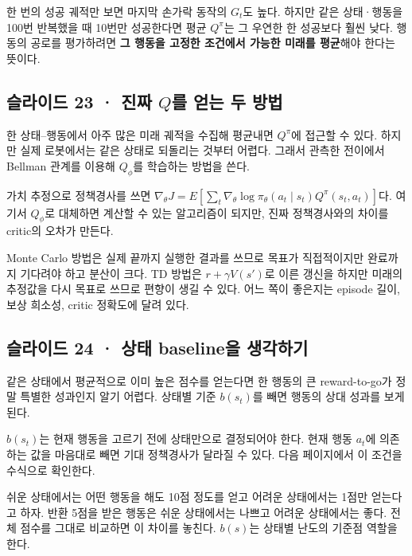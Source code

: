 \documentclass[11pt,a4paper]{article}
\begin{document}
한 번의 성공 궤적만 보면 마지막 손가락 동작의 $G_t$도 높다. 하지만 같은 상태·행동을 100번 반복했을 때 10번만 성공한다면 평균 $Q^\pi$는 그 우연한 한 성공보다 훨씬 낮다. 행동의 공로를 평가하려면 \textbf{그 행동을 고정한 조건에서 가능한 미래를 평균}해야 한다는 뜻이다.\par

\subsection{슬라이드 23 · 진짜 $Q$를 얻는 두 방법}

한 상태–행동에서 아주 많은 미래 궤적을 수집해 평균내면 $Q^\pi$에 접근할 수 있다. 하지만 실제 로봇에서는 같은 상태로 되돌리는 것부터 어렵다. 그래서 관측한 전이에서 Bellman 관계를 이용해 $Q_\phi$를 학습하는 방법을 쓴다.\par

가치 추정으로 정책경사를 쓰면 $\nabla_\theta J=E[\sum_t\nabla_\theta\log\pi_\theta(a_t\mid s_t)Q^\pi(s_t,a_t)]$다. 여기서 $Q_\phi$로 대체하면 계산할 수 있는 알고리즘이 되지만, 진짜 정책경사와의 차이를 critic의 오차가 만든다.\par

Monte Carlo 방법은 실제 끝까지 실행한 결과를 쓰므로 목표가 직접적이지만 완료까지 기다려야 하고 분산이 크다. TD 방법은 $r+\gamma V(s')$로 이른 갱신을 하지만 미래의 추정값을 다시 목표로 쓰므로 편향이 생길 수 있다. 어느 쪽이 좋은지는 episode 길이, 보상 희소성, critic 정확도에 달려 있다.\par

\subsection{슬라이드 24 · 상태 baseline을 생각하기}

같은 상태에서 평균적으로 이미 높은 점수를 얻는다면 한 행동의 큰 reward-to-go가 정말 특별한 성과인지 알기 어렵다. 상태별 기준 $b(s_t)$를 빼면 행동의 상대 성과를 보게 된다.\par

$b(s_t)$는 현재 행동을 고르기 전에 상태만으로 결정되어야 한다. 현재 행동 $a_t$에 의존하는 값을 마음대로 빼면 기대 정책경사가 달라질 수 있다. 다음 페이지에서 이 조건을 수식으로 확인한다.\par

쉬운 상태에서는 어떤 행동을 해도 10점 정도를 얻고 어려운 상태에서는 1점만 얻는다고 하자. 반환 5점을 받은 행동은 쉬운 상태에서는 나쁘고 어려운 상태에서는 좋다. 전체 점수를 그대로 비교하면 이 차이를 놓친다. $b(s)$는 상태별 난도의 기준점 역할을 한다.\par
\end{document}
